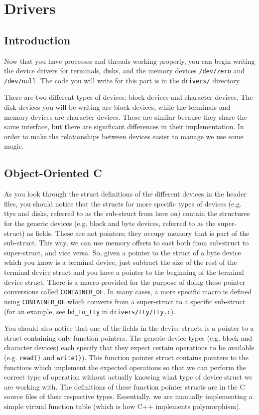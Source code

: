 \chapter{Drivers}

\label{kern2}

\section{Introduction}
Now that you have processes and threads working properly, you can begin writing the device drivers for terminals, disks, and the memory devices \texttt{/dev/zero} and \texttt{/dev/null}. The code you will write for this part is in the \texttt{drivers/} directory. 

There are two different types of devices: block devices and character devices. The disk devices you will be writing are block devices, while the terminals and memory devices are character devices. These are similar because they share the same interface, but there are significant differences in their implementation. In order to make the relationships between devices easier to manage we use some magic.

\section{Object-Oriented C}
As you look through the struct definitions of the different devices in the header files, you should notice that the structs for more specific types of devices (e.g. ttys and disks, referred to as the sub-struct from here on) contain the structures for the generic devices (e.g. block and byte devices, referred to as the super-struct) as fields. These are not pointers; they occupy memory that is part of the sub-struct. This way, we can use memory offsets to cast both from sub-struct to super-struct, and vice versa. So, given a pointer to the struct of a byte device which you know is a terminal device, just subtract the size of the rest of the terminal device struct and you have a pointer to the beginning of the terminal device struct. There is a macro provided for the purpose of doing these pointer conversions called \texttt{CONTAINER\_OF}. In many cases, a more specific macro is defined using \texttt{CONTAINER\_OF} which converts from a super-struct to a specific sub-struct (for an example, see \texttt{bd\_to\_tty} in \texttt{drivers/tty/tty.c}).

You should also notice that one of the fields in the device structs is a pointer to a struct containing only function pointers. The generic device types (e.g. block and character devices) each specify that they expect certain operations to be available (e.g. \texttt{read()} and \texttt{write()}). This function pointer struct contains pointers to the functions which implement the expected operations so that we can perform the correct type of operation without actually knowing what type of device struct we are working with. The definitions of these function pointer structs are in the C source files of their respective types. Essentially, we are manually implementing a simple virtual function table (which is how C++ implements polymorphism). 

